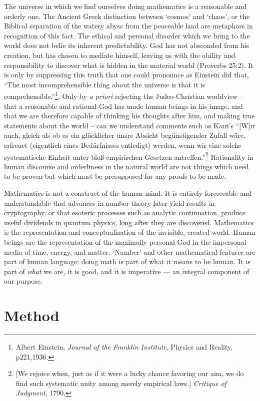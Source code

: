 The universe in which we find ourselves doing mathematics is a 
reasonable and orderly one.  The Ancient Greek distinction between `cosmos' 
and `chaos', or the Biblical separation of the watery abyss from the peaceable land are
metaphors in recognition of this fact.  The ethical and personal disorder which we bring to the world
does not belie its inherent predictability.  
God has not absconded from his creation, but has
chosen to mediate himself, leaving us with the ability and responsibility to discover
what is hidden in the material world (Proverbs 25:2).  It is only by suppressing this truth that one could
pronounce as Einstein did that, ``The most incomprehensible thing about the universe 
is that it is comprehensible.''\footnote{Albert Einstein, \emph{Journal of the Franklin Institute}, Physics and Reality, p221,1936.}.
Only by \textit{a priori} rejecting the Judeo-Christian worldview -- that a reasonable and rational God
has made human beings in his image, and that we are therefore capable of thinking his thoughts
after him, and making true statements about the world -- can we understand comments such 
as Kant's ``[W]ir auch, gleich als ob es ein glücklicher unsre Absicht begünstigender Zufall wäre, 
erfreuet (eigentlich eines Bedürfnisses entledigt) werden, wenn wir eine solche systematische 
Einheit unter bloß empirischen Gesetzen antreffen.''\footnote{
[We rejoice when, just as if it were a lucky chance favoring 
our aim, we do find such systematic unity among merely empirical laws.] \textit{Critique of Judgment}, 1790.}
Rationality in human discourse and orderliness in the natural world are not things
which need to be proven but which must be presupposed for any proofs to be made.

Mathematics is not a construct of the human mind.  It is entirely foreseeable and 
understandable that advances in number theory later yield results in cryptography,
or that esoteric processes such as analytic continuation, produce useful dividends in
quantum physics, long after they are discovered.  Mathematics is the representation
and conceptualization of the invisible, created world.  Human beings are the representation
of the maximally personal God in the impersonal media of time, energy, and matter. 
`Number' and other mathematical features are part of human language:
doing math is part of what it means to be human.  It is part of \emph{what} we are,
it is good, and it is imperative --- an integral component of our purpose.

\section{Method}

